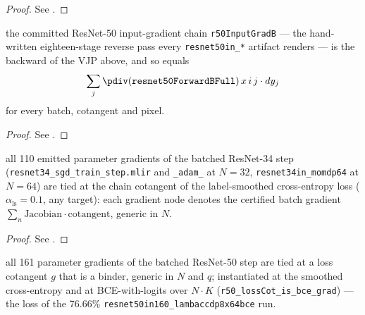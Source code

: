 \begin{proof}
\leanok
See .
\end{proof}

\begin{theorem}
  \label{thm:resnet50_whole_back}
  \leanok
  \Prove{} the committed ResNet-50 input-gradient chain
  \texttt{r50InputGradB} --- the hand-written eighteen-stage reverse pass every
  \texttt{resnet50in\_*} artifact renders --- is the backward of the VJP above,
  and so equals
  \[
    \sum_j \pdiv(\texttt{resnet50ForwardBFull})\, x\, i\, j
  \cdot dy_j
  \]
  for every batch, cotangent and pixel.
\end{theorem}

\begin{proof}
\leanok
See .
\end{proof}

\begin{theorem}
  \label{thm:resnet34_step_tie}
  \leanok
  \Prove{} all 110 emitted parameter gradients of the batched ResNet-34 step
  (\texttt{resnet34\_sgd\_train\_step.mlir} and \texttt{\_adam\_} at \(N = 32\),
  \texttt{resnet34in\_momdp64} at \(N = 64\)) are tied at the chain cotangent of
  the label-smoothed cross-entropy loss (\(\alpha_{\mathrm{ls}} = 0.1\), any
  target): each gradient node denotes the certified batch gradient
  \(\sum_n \mathrm{Jacobian} \cdot \mathrm{cotangent}\), generic in \(N\).
\end{theorem}

\begin{proof}
\leanok
See .
\end{proof}

\begin{theorem}
  \label{thm:resnet50_step_tie}
  \leanok
  \Prove{} all 161 parameter gradients of the batched ResNet-50 step are tied
  at a loss cotangent \(g\) that is a binder, generic in \(N\) and \(q\);
  instantiated at the smoothed cross-entropy and at BCE-with-logits over
  \(N \cdot K\) (\texttt{r50\_lossCot\_is\_bce\_grad}) --- the loss of the
  76.66\% \texttt{resnet50in160\_lambaccdp8x64bce} run.
\end{theorem}


